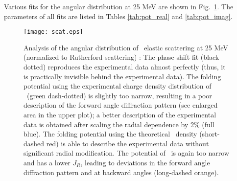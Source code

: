 Various fits for the angular distribution at 25 MeV \cite{Gub81} are shown in
Fig.~\ref{fig:scat}. The parameters of all fits are listed in Tables
\ref{tab:pot_real} and \ref{tab:pot_imag}.
%
\begin{figure}[htb]
  \texttt{[image: scat.eps]}
\caption{
Analysis of the angular distribution of \tinull \raa \tinull\ elastic
scattering at 25 MeV (normalized to Rutherford scattering) \cite{Gub81,EXFOR}:
The phase shift fit (black dotted) reproduces the experimental data almost
perfectly (thus, it is practically invisible behind the experimental data). The
folding potential using the experimental charge density distribution of
\tinull\ (green dash-dotted) is slightly too narrow, resulting in a poor
description of the forward angle diffraction pattern (see enlarged area in the
upper plot); a better description of the experimental data is obtained after
scaling the radial dependence by 2\% (full blue). The folding potential using
the theoretical \tinull\ density (short-dashed red) is able to describe the
experimental data without significant radial modification. The potential of
\SM\ is again too narrow and has a lower $J_R$, leading to deviations in the
forward angle diffraction pattern and at backward angles (long-dashed orange).
}
\label{fig:scat}
\end{figure}
%

